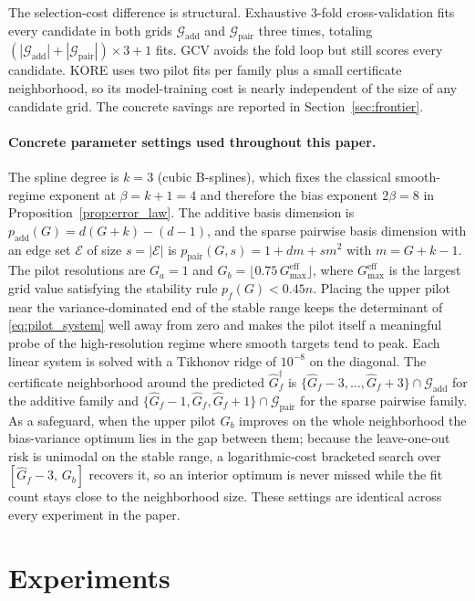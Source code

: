 \documentclass{article}
\newcommand{\KORE}{\textsc{KORE}}
\newcommand{\add}{\mathrm{add}}
\newcommand{\pair}{\mathrm{pair}}
\begin{document}
The selection-cost difference is structural. Exhaustive 3-fold cross-validation fits every candidate in both grids $\mathcal{G}_{\add}$ and $\mathcal{G}_{\pair}$ three times, totaling $(|\mathcal{G}_{\add}|+|\mathcal{G}_{\pair}|)\times3+1$ fits. GCV avoids the fold loop but still scores every candidate. \KORE{} uses two pilot fits per family plus a small certificate neighborhood, so its model-training cost is nearly independent of the size of any candidate grid. The concrete savings are reported in Section~\ref{sec:frontier}.

\paragraph{Concrete parameter settings used throughout this paper.}
The spline degree is $k=3$ (cubic B-splines), which fixes the classical smooth-regime exponent at $\beta=k+1=4$ and therefore the bias exponent $2\beta=8$ in Proposition~\ref{prop:error_law}. The additive basis dimension is $p_{\add}(G)=d(G+k)-(d-1)$, and the sparse pairwise basis dimension with an edge set $\mathcal{E}$ of size $s=|\mathcal{E}|$ is $p_{\pair}(G,s)=1+dm+s m^2$ with $m=G+k-1$. The pilot resolutions are $G_a=1$ and $G_b=\lfloor 0.75\,G_{\max}^{\mathrm{eff}}\rfloor$, where $G_{\max}^{\mathrm{eff}}$ is the largest grid value satisfying the stability rule $p_f(G)<0.45n$. Placing the upper pilot near the variance-dominated end of the stable range keeps the determinant of \eqref{eq:pilot_system} well away from zero and makes the pilot itself a meaningful probe of the high-resolution regime where smooth targets tend to peak. Each linear system is solved with a Tikhonov ridge of $10^{-8}$ on the diagonal. The certificate neighborhood around the predicted $\widehat G_f^\dagger$ is $\{\widehat G_f-3,\dots,\widehat G_f+3\}\cap\mathcal{G}_{\add}$ for the additive family and $\{\widehat G_f-1,\widehat G_f,\widehat G_f+1\}\cap\mathcal{G}_{\pair}$ for the sparse pairwise family. As a safeguard, when the upper pilot $G_b$ improves on the whole neighborhood the bias-variance optimum lies in the gap between them; because the leave-one-out risk is unimodal on the stable range, a logarithmic-cost bracketed search over $[\widehat G_f-3,\,G_b]$ recovers it, so an interior optimum is never missed while the fit count stays close to the neighborhood size. These settings are identical across every experiment in the paper.

\section{Experiments}
\label{sec:experiments}
\end{document}

